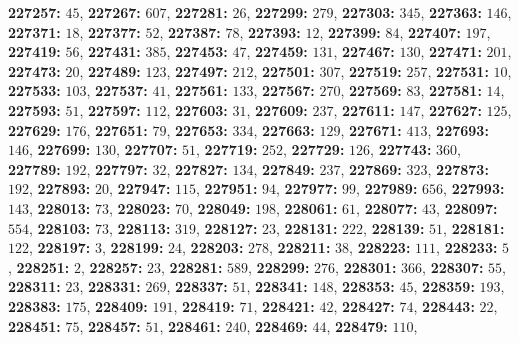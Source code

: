 \textsf{\bfseries 227257:} $45$, \textsf{\bfseries 227267:} $607$, \textsf{\bfseries 227281:} $26$, \textsf{\bfseries 227299:} $279$, \textsf{\bfseries 227303:} $345$, \textsf{\bfseries 227363:} $146$, \textsf{\bfseries 227371:} $18$, \textsf{\bfseries 227377:} $52$, \textsf{\bfseries 227387:} $78$, \textsf{\bfseries 227393:} $12$, \textsf{\bfseries 227399:} $84$, \textsf{\bfseries 227407:} $197$, \textsf{\bfseries 227419:} $56$, \textsf{\bfseries 227431:} $385$, \textsf{\bfseries 227453:} $47$, \textsf{\bfseries 227459:} $131$, \textsf{\bfseries 227467:} $130$, \textsf{\bfseries 227471:} $201$, \textsf{\bfseries 227473:} $20$, \textsf{\bfseries 227489:} $123$, \textsf{\bfseries 227497:} $212$, \textsf{\bfseries 227501:} $307$, \textsf{\bfseries 227519:} $257$, \textsf{\bfseries 227531:} $10$, \textsf{\bfseries 227533:} $103$, \textsf{\bfseries 227537:} $41$, \textsf{\bfseries 227561:} $133$, \textsf{\bfseries 227567:} $270$, \textsf{\bfseries 227569:} $83$, \textsf{\bfseries 227581:} $14$, \textsf{\bfseries 227593:} $51$, \textsf{\bfseries 227597:} $112$, \textsf{\bfseries 227603:} $31$, \textsf{\bfseries 227609:} $237$, \textsf{\bfseries 227611:} $147$, \textsf{\bfseries 227627:} $125$, \textsf{\bfseries 227629:} $176$, \textsf{\bfseries 227651:} $79$, \textsf{\bfseries 227653:} $334$, \textsf{\bfseries 227663:} $129$, \textsf{\bfseries 227671:} $413$, \textsf{\bfseries 227693:} $146$, \textsf{\bfseries 227699:} $130$, \textsf{\bfseries 227707:} $51$, \textsf{\bfseries 227719:} $252$, \textsf{\bfseries 227729:} $126$, \textsf{\bfseries 227743:} $360$, \textsf{\bfseries 227789:} $192$, \textsf{\bfseries 227797:} $32$, \textsf{\bfseries 227827:} $134$, \textsf{\bfseries 227849:} $237$, \textsf{\bfseries 227869:} $323$, \textsf{\bfseries 227873:} $192$, \textsf{\bfseries 227893:} $20$, \textsf{\bfseries 227947:} $115$, \textsf{\bfseries 227951:} $94$, \textsf{\bfseries 227977:} $99$, \textsf{\bfseries 227989:} $656$, \textsf{\bfseries 227993:} $143$, \textsf{\bfseries 228013:} $73$, \textsf{\bfseries 228023:} $70$, \textsf{\bfseries 228049:} $198$, \textsf{\bfseries 228061:} $61$, \textsf{\bfseries 228077:} $43$, \textsf{\bfseries 228097:} $554$, \textsf{\bfseries 228103:} $73$, \textsf{\bfseries 228113:} $319$, \textsf{\bfseries 228127:} $23$, \textsf{\bfseries 228131:} $222$, \textsf{\bfseries 228139:} $51$, \textsf{\bfseries 228181:} $122$, \textsf{\bfseries 228197:} $3$, \textsf{\bfseries 228199:} $24$, \textsf{\bfseries 228203:} $278$, \textsf{\bfseries 228211:} $38$, \textsf{\bfseries 228223:} $111$, \textsf{\bfseries 228233:} $5$, \textsf{\bfseries 228251:} $2$, \textsf{\bfseries 228257:} $23$, \textsf{\bfseries 228281:} $589$, \textsf{\bfseries 228299:} $276$, \textsf{\bfseries 228301:} $366$, \textsf{\bfseries 228307:} $55$, \textsf{\bfseries 228311:} $23$, \textsf{\bfseries 228331:} $269$, \textsf{\bfseries 228337:} $51$, \textsf{\bfseries 228341:} $148$, \textsf{\bfseries 228353:} $45$, \textsf{\bfseries 228359:} $193$, \textsf{\bfseries 228383:} $175$, \textsf{\bfseries 228409:} $191$, \textsf{\bfseries 228419:} $71$, \textsf{\bfseries 228421:} $42$, \textsf{\bfseries 228427:} $74$, \textsf{\bfseries 228443:} $22$, \textsf{\bfseries 228451:} $75$, \textsf{\bfseries 228457:} $51$, \textsf{\bfseries 228461:} $240$, \textsf{\bfseries 228469:} $44$, \textsf{\bfseries 228479:} $110$, 

